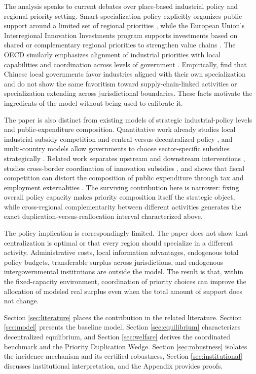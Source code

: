 The analysis speaks to current debates over place-based industrial policy and regional priority setting. Smart-specialization policy explicitly organizes public support around a limited set of regional priorities \citep{ForayEichlerKeller2021}, while the European Union's Interregional Innovation Investments program supports investments based on shared or complementary regional priorities to strengthen value chains \citep{EISMEA2026}. The OECD similarly emphasizes alignment of industrial priorities with local capabilities and coordination across levels of government \citep{OECD2025}. Empirically, \citet{TianWangZhang2027} find that Chinese local governments favor industries aligned with their own specialization and do not show the same favoritism toward supply-chain-linked activities or specialization extending across jurisdictional boundaries. These facts motivate the ingredients of the model without being used to calibrate it.

The paper is also distinct from existing models of strategic industrial-policy levels and public-expenditure composition. Quantitative work already studies local industrial subsidy competition and central versus decentralized policy \citep{ChenLi2026}, and multi-country models allow governments to choose sector-specific subsidies strategically \citep{WangXuYangZhu2024}. Related work separates upstream and downstream interventions \citep{Fischer2017,FischerGreakerRosendahl2018}, studies cross-border coordination of innovation subsidies \citep{BorotaMilicevicEtAl2026}, and shows that fiscal competition can distort the composition of public expenditure through tax and employment externalities \citep{KikuchiKuzawaTamai2026}. The surviving contribution here is narrower: fixing overall policy capacity makes priority composition itself the strategic object, while cross-regional complementarity between different activities generates the exact duplication-versus-reallocation interval characterized above.

The policy implication is correspondingly limited. The paper does not show that centralization is optimal or that every region should specialize in a different activity. Administrative costs, local information advantages, endogenous total policy budgets, transferable surplus across jurisdictions, and endogenous intergovernmental institutions are outside the model. The result is that, within the fixed-capacity environment, coordination of priority choices can improve the allocation of modeled real surplus even when the total amount of support does not change.

Section \ref{sec:literature} places the contribution in the related literature. Section \ref{sec:model} presents the baseline model, Section \ref{sec:equilibrium} characterizes decentralized equilibrium, and Section \ref{sec:welfare} derives the coordinated benchmark and the Priority Duplication Wedge. Section \ref{sec:robustness} isolates the incidence mechanism and its certified robustness, Section \ref{sec:institutional} discusses institutional interpretation, and the Appendix provides proofs.
